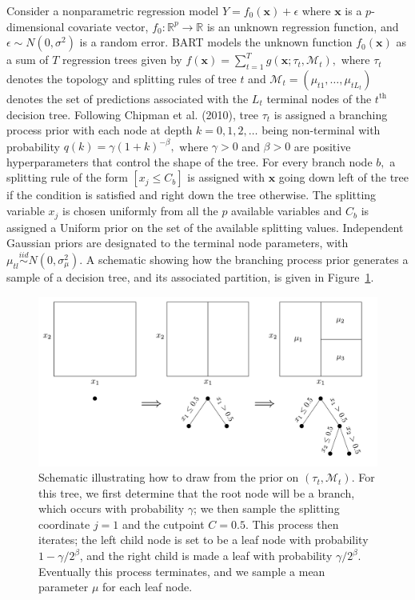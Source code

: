 \documentclass[11pt]{article}
\begin{document}
 Consider a nonparametric regression model $Y = f_0(\mathbf{x}) + \epsilon$ where $\mathbf{x}$ is a $p$-dimensional covariate vector, $f_0:\mathbb{R}^p \to \mathbb{R}$ is an unknown regression function, and $\epsilon \sim N(0,\sigma^2)$ is a random error. BART models the unknown function $f_0(\mathbf{x})$ as a sum of $T$ regression trees given by $f(\mathbf{x}) = \sum_{t=1}^{T}g(\mathbf{x}; \tau_t, \mathcal{M}_t),$ where $\tau_t$ denotes the topology and splitting rules of tree $t$ and $\mathcal{M}_t = (\mu_{t1}, \dots, \mu_{tL_t})$ denotes the set of predictions associated with the $L_t$ terminal nodes of the $t^{\text{th}}$ decision tree. Following Chipman et al. (2010), tree $\tau_t$ is assigned a branching process prior with each node at depth $k=0,1,2,\dots$ being non-terminal with probability $q(k) = \gamma(1+k)^{-\beta},$ where $\gamma > 0$ and $\beta >0$ are positive hyperparameters that control the shape of the tree. For every branch node $b,$ a splitting rule of the form $[x_j \leq C_b]$ is assigned with $\mathbf{x}$ going down left of the tree if the condition is satisfied and right down the tree otherwise. The splitting variable $x_j$ is chosen uniformly from all the $p$ available variables and $C_b$ is assigned a Uniform prior on the set of the available splitting values. Independent Gaussian priors are designated to the terminal node parameters, with $\mu_{tl} \stackrel{iid}{\sim} N(0,\sigma^2_\mu).$ A schematic showing how the branching process prior generates a sample of a decision tree, and its associated partition, is given in Figure~\ref{fig:TreeGrow}. 
 
 
 
 \begin{figure}
     \centering
     \includegraphics[width=.8\textwidth]{TreeGrow}
     \caption{Schematic illustrating how to draw from the prior on $(\tau_t, \mathcal M_t)$. For this tree, we first determine that the root node will be a branch, which occurs with probability $\gamma$; we then sample the splitting coordinate $j = 1$ and the cutpoint $C = 0.5$. This process then iterates; the left child node is set to be a leaf node with probability $1 - \gamma/2^\beta$, and the right child is made a leaf with probability $\gamma/2^\beta$. Eventually this process terminates, and we sample a mean parameter $\mu$ for each leaf node.}
     \label{fig:TreeGrow}
 \end{figure}
 
\end{document}
